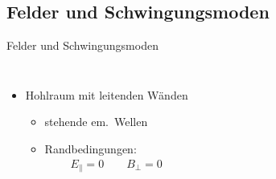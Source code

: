 \documentclass[12pt,xcolor=dvipsnames,professionalfonts]{beamer}
\begin{document}
\subsection{Felder und Schwingungsmoden}
\begin{frame}{Felder und Schwingungsmoden}
	\begin{columns}[T]
		\begin{itemize}
			\item Hohlraum mit leitenden Wänden
			\begin{itemize}
				\setlength\itemsep{0.25em}
				
				\item stehende em.\ Wellen
				
				\item Randbedingungen:
				\begin{align*}
				E_\parallel = 0 \qquad B_\perp = 0
				\end{align*}
				

\end{itemize}
\end{itemize}
\end{columns}
\end{frame}
\end{document}
